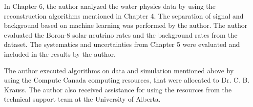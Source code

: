 In Chapter 6, the author analyzed the water physics data by using the reconstruction algorithms mentioned in Chapter 4. The separation of signal and background based on machine learning was performed by the author. The author evaluated the Boron-8 solar neutrino rates and the background rates from the dataset. The systematics and uncertainties from Chapter 5 were evaluated and included in the results by the author.

The author executed algorithms on data and simulation mentioned above by using the Compute Canada computing resources, that were allocated to Dr. C. B. Krauss. The author also received assistance for using the resources from the technical support team at the University of Alberta.
